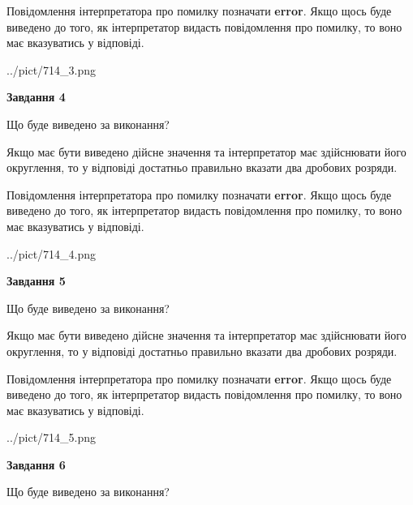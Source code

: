 \documentclass[12pt, ukrainian]{article}
\begin{document}
{\begin {Large}
Повідомлення інтерпретатора про помилку позначати \textbf{error}.
Якщо щось буде виведено до того, як інтерпретатор видасть повідомлення про помилку, 
то воно має вказуватись у відповіді. \par

\begin{center}
	{../pict/714_3.png}
\end{center}
\newpage

{\begin {center}\textbf{Завдання 4}\end {center}}\par
Що буде виведено за виконання? \par

Якщо має бути виведено дійсне значення та інтерпретатор має здійснювати його округлення, 
то у відповіді достатньо правильно вказати два дробових розряди.

Повідомлення інтерпретатора про помилку позначати \textbf{error}.
Якщо щось буде виведено до того, як інтерпретатор видасть повідомлення про помилку, 
то воно має вказуватись у відповіді. \par

\begin{center}
	{../pict/714_4.png}
\end{center}
\newpage

{\begin {center}\textbf{Завдання 5}\end {center}}\par
Що буде виведено за виконання? \par

Якщо має бути виведено дійсне значення та інтерпретатор має здійснювати його округлення, 
то у відповіді достатньо правильно вказати два дробових розряди.

Повідомлення інтерпретатора про помилку позначати \textbf{error}.
Якщо щось буде виведено до того, як інтерпретатор видасть повідомлення про помилку, 
то воно має вказуватись у відповіді. \par

\begin{center}
	{../pict/714_5.png}
\end{center}
\newpage

{\begin {center}\textbf{Завдання 6}\end {center}}\par
Що буде виведено за виконання? \par


\end{Large}}
\end{document}
